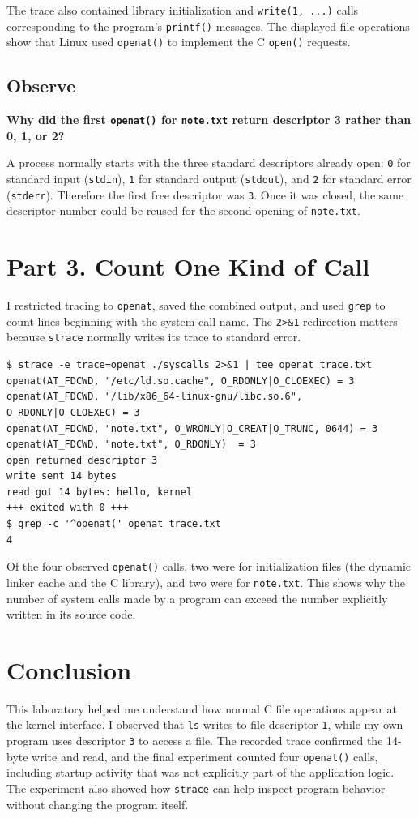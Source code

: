 \documentclass[12pt,a4paper]{article}
\begin{document}
The trace also contained library initialization and \texttt{write(1, ...)} calls corresponding to the program's \texttt{printf()} messages. The displayed file operations show that Linux used \texttt{openat()} to implement the C \texttt{open()} requests.

\subsection{Observe}
\textbf{Why did the first \texttt{openat()} for \texttt{note.txt} return descriptor 3 rather than 0, 1, or 2?}

A process normally starts with the three standard descriptors already open: \texttt{0} for standard input (\texttt{stdin}), \texttt{1} for standard output (\texttt{stdout}), and \texttt{2} for standard error (\texttt{stderr}). Therefore the first free descriptor was \texttt{3}. Once it was closed, the same descriptor number could be reused for the second opening of \texttt{note.txt}.

\section{Part 3. Count One Kind of Call}
I restricted tracing to \texttt{openat}, saved the combined output, and used \texttt{grep} to count lines beginning with the system-call name. The \texttt{2>\&1} redirection matters because \texttt{strace} normally writes its trace to standard error.

\begin{lstlisting}[caption={Tracing and counting openat calls}]
$ strace -e trace=openat ./syscalls 2>&1 | tee openat_trace.txt
openat(AT_FDCWD, "/etc/ld.so.cache", O_RDONLY|O_CLOEXEC) = 3
openat(AT_FDCWD, "/lib/x86_64-linux-gnu/libc.so.6", O_RDONLY|O_CLOEXEC) = 3
openat(AT_FDCWD, "note.txt", O_WRONLY|O_CREAT|O_TRUNC, 0644) = 3
openat(AT_FDCWD, "note.txt", O_RDONLY)  = 3
open returned descriptor 3
write sent 14 bytes
read got 14 bytes: hello, kernel
+++ exited with 0 +++
$ grep -c '^openat(' openat_trace.txt
4
\end{lstlisting}

Of the four observed \texttt{openat()} calls, two were for initialization files (the dynamic linker cache and the C library), and two were for \texttt{note.txt}. This shows why the number of system calls made by a program can exceed the number explicitly written in its source code.

\section{Conclusion}
This laboratory helped me understand how normal C file operations appear at the kernel interface. I observed that \texttt{ls} writes to file descriptor \texttt{1}, while my own program uses descriptor \texttt{3} to access a file. The recorded trace confirmed the 14-byte write and read, and the final experiment counted four \texttt{openat()} calls, including startup activity that was not explicitly part of the application logic. The experiment also showed how \texttt{strace} can help inspect program behavior without changing the program itself.
\end{document}
